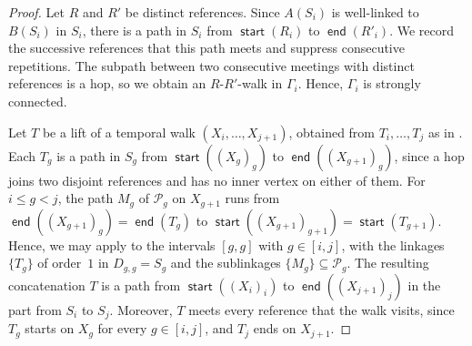 \documentclass[fontsize=12pt,leading=14pt]{fullpaper}
\DeclareMathOperator{\st}{\mathsf{start}}
\DeclareMathOperator{\en}{\mathsf{end}}
\newcommand{\Pcal}{\mathcal{P}}
\begin{document}
\begin{proof}
  Let $R$ and $R'$ be distinct references.
  Since $A(S_i)$ is well-linked to $B(S_i)$ in $S_i$, there is a path in $S_i$ from $\st(R_i)$ to $\en(R'_i)$.
  We record the successive references that this path meets and suppress consecutive repetitions.
  The subpath between two consecutive meetings with distinct references is a hop, so we obtain an $R$-$R'$-walk in $\Gamma_i$.
  Hence, $\Gamma_i$ is strongly connected.

  Let $T$ be a lift of a temporal walk $(X_i,\dots,X_{j+1})$, obtained from $T_i,\dots,T_j$ as in .
  Each $T_g$ is a path in $S_g$ from $\st((X_g)_g)$ to $\en((X_{g+1})_g)$, since a hop joins two disjoint references and has no inner vertex on either of them.
  For $i\le g<j$, the path $M_g$ of $\Pcal_g$ on $X_{g+1}$ runs from $\en((X_{g+1})_g)=\en(T_g)$ to $\st((X_{g+1})_{g+1})=\st(T_{g+1})$.
  Hence, we may apply  to the intervals $[g,g]$ with $g\in[i,j]$, with the linkages $\{T_g\}$ of order~$1$ in $D_{g,g}=S_g$ and the sublinkages $\{M_g\}\subseteq\Pcal_g$.
  The resulting concatenation $T$ is a path from $\st((X_i)_i)$ to $\en((X_{j+1})_j)$ in the part from $S_i$ to $S_j$.
  Moreover, $T$ meets every reference that the walk visits, since $T_g$ starts on $X_g$ for every $g\in[i,j]$, and $T_j$ ends on $X_{j+1}$.


\end{proof}
\end{document}
